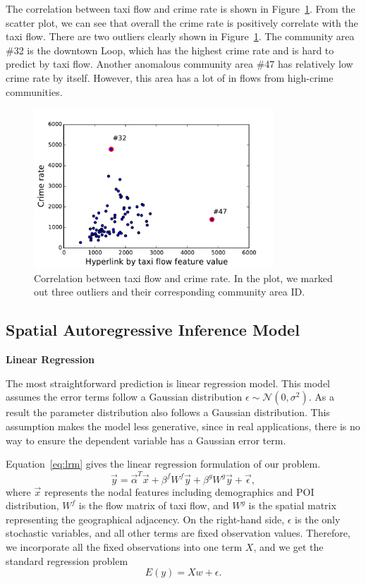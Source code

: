 The correlation between taxi flow and crime rate is shown in Figure~\ref{fig:taxi-corr}. From the scatter plot, we can see that overall the crime rate is positively correlate with the taxi flow. There are two  outliers clearly shown in Figure~\ref{fig:taxi-corr}. The community area \#32 is the downtown Loop, which has the highest crime rate and is hard to predict by taxi flow. Another anomalous community area \#47 has relatively low crime rate by itself. However, this area has a lot of in flows from high-crime communities. 




\begin{figure}[ht]
\centering
\includegraphics[width=0.8\textwidth]{fig/taxi-flow-percent.pdf}
\caption{Correlation between taxi flow and crime rate. In the plot, we marked out three outliers and their corresponding community area ID.}
\label{fig:taxi-corr}
\end{figure}






\subsection{Spatial Autoregressive Inference Model}



\textbf{Linear Regression}

The most straightforward prediction is linear regression model. This model assumes the error terms follow a Gaussian distribution $\epsilon \sim \mathcal{N}(0, \sigma^2)$. As a result the parameter distribution also follows a Gaussian distribution. This assumption makes the model less generative, since in real applications, there is no way to ensure the dependent variable has a Gaussian error term. 


Equation~\ref{eq:lrm} gives the linear regression formulation of our problem.
\begin{equation}
\label{eq:lrm}
\vec{y} = \vec{\alpha}^T \vec{x} + \beta^f W^f \vec{y} + \beta^g W^g \vec{y} + \vec{\epsilon},
\end{equation}
where $\vec{x}$ represents the nodal features including demographics and POI distribution, $W^f$ is the flow matrix of taxi flow, and $W^g$ is the spatial matrix representing the geographical adjacency. On the right-hand side, $\epsilon$ is the only stochastic variables, and all other terms are fixed observation values. Therefore, we incorporate all the fixed observations into one term $X$, and we get the standard regression problem
\[
E(y) = X w + \epsilon.
\]


